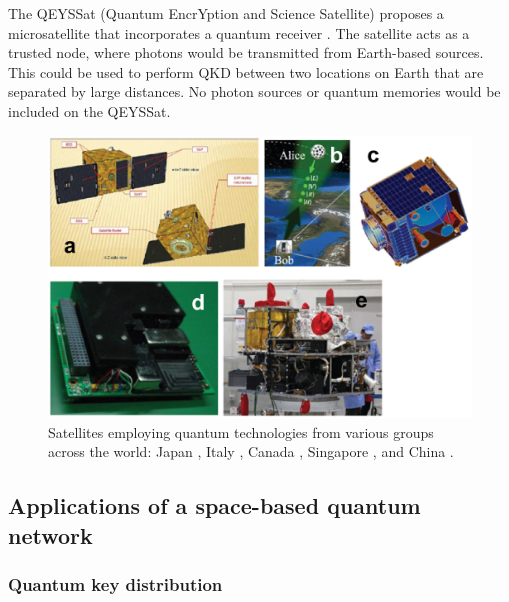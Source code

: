 \documentclass[aps,rmp,reprint,amsmath,amssymb,graphicx,longbibliography]{revtex4-1}
\begin{document}
The QEYSSat (Quantum EncrYption and Science Satellite) proposes a microsatellite that incorporates a quantum receiver \cite{jennewein2014qeyssat}. The satellite acts as a trusted node, where photons would be transmitted from Earth-based sources. This could be used to perform QKD between two locations on Earth that are separated by large distances. No photon sources or quantum memories would be included on the QEYSSat. 





\begin{figure}
\includegraphics[width=\columnwidth]{figspace2}
\caption{Satellites employing quantum technologies from various groups across the world: Japan \cite{horiuchi2015view}, Italy \cite{vallone15}, Canada \cite{jennewein2014qeyssat}, Singapore \cite{tang2016generation}, and China \cite{gibney16}.}
\label{figspace2}
\end{figure}









\subsection{Applications of a space-based quantum network}

\subsubsection{Quantum key distribution}
\end{document}
